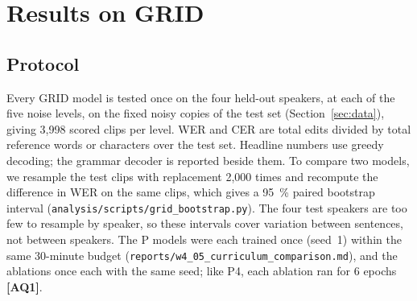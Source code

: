 \section{Results on GRID}
\label{sec:results}

\subsection{Protocol}
Every GRID model is tested once on the four held-out speakers, at each of the five noise levels,
on the fixed noisy copies of the test set (Section~\ref{sec:data}), giving 3,998 scored clips per
level. WER and CER are total edits divided by total reference words or characters over the test
set. Headline numbers use greedy decoding; the grammar decoder is reported beside them. To compare
two models, we resample the test clips with replacement 2,000 times and recompute the difference in
WER on the same clips, which gives a 95~\% paired bootstrap interval
(\texttt{analysis/\allowbreak{}scripts/\allowbreak{}grid\_\allowbreak{}bootstrap.py}). The four test speakers are too few to resample by
speaker, so these intervals cover variation between sentences, not between speakers. The P models
were each trained once (seed~1) within the same 30-minute budget
(\texttt{reports/\allowbreak{}w4\_\allowbreak{}05\_\allowbreak{}curriculum\_\allowbreak{}comparison.md}), and the ablations once each with the same
seed; like P4, each ablation ran for 6 epochs \textbf{[AQ1]}.

